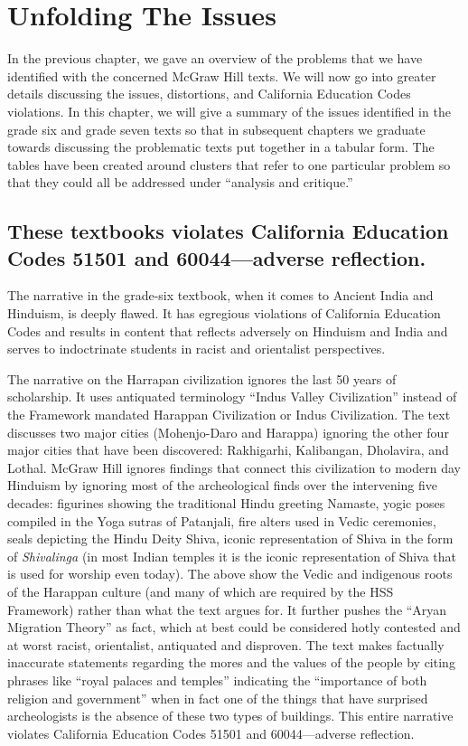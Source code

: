 \chapter{Unfolding The Issues}

In the previous chapter, we gave an overview of the problems that we have identified with the concerned McGraw Hill texts. We will now go into greater details discussing the issues, distortions, and California Education Codes violations. In this chapter, we will give a summary of the issues identified in the grade six and grade seven texts so that in subsequent chapters we graduate towards discussing the problematic texts put together in a tabular form. The tables have been created around clusters that refer to one particular problem so that they could all be addressed under “analysis and critique.”  

\section*{These textbooks violates California Education Codes 51501 and 60044—adverse reflection.} 

The narrative in the grade-six textbook, when it comes to Ancient India and Hinduism, is deeply flawed. It has egregious violations of California Education Codes and results in content that reflects adversely on Hinduism and India and serves to indoctrinate students in racist and orientalist perspectives.

The narrative on the Harrapan civilization ignores the last 50 years of scholarship. It uses antiquated terminology “Indus Valley Civilization” instead of the Framework mandated Harappan Civilization or Indus Civilization. The text discusses two major cities (Mohenjo-Daro and Harappa) ignoring the other four major cities that have been discovered: Rakhigarhi, Kalibangan, Dholavira, and Lothal. McGraw Hill ignores findings that connect this civilization to modern day Hinduism by ignoring most of the archeological finds over the intervening five decades: figurines showing the traditional Hindu greeting Namaste, yogic poses compiled in the Yoga sutras of Patanjali, fire alters used in Vedic ceremonies, seals depicting the Hindu Deity Shiva, iconic representation of Shiva in the form of \textit{Shivalinga}  (in most Indian temples it is the iconic representation of Shiva that is used for worship even today). The above show the Vedic and indigenous roots of the Harappan culture (and many of which are required by the HSS Framework) rather than what the text argues for. It further pushes the “Aryan Migration Theory” as fact, which at best could be considered hotly contested and at worst racist, orientalist, antiquated and disproven. The text makes factually inaccurate statements regarding the mores and the values of the people by citing phrases like “royal palaces and temples” indicating the “importance of both religion and government” when in fact one of the things that have surprised archeologists is the absence of these two types of buildings. This entire narrative violates California Education Codes 51501 and 60044—adverse reflection.  


